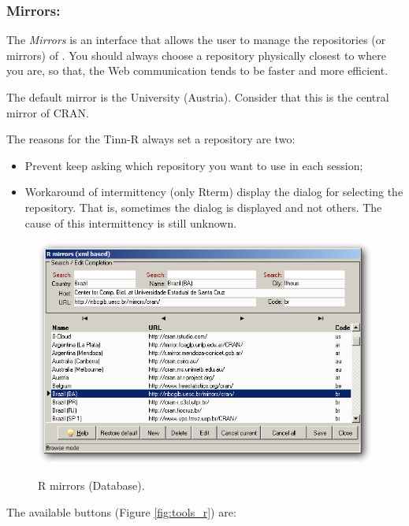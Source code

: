 \subsubsection{Mirrors:}

The \textit{Mirrors} is an interface that allows the user to manage the repositories (or mirrors) of \RR{}.
You should always choose a repository physically closest to where you are,
so that, the Web communication tends to be faster and more efficient.

The default mirror is the University 
(Austria). Consider that this is the central mirror of CRAN.

The reasons for the Tinn-R always set a repository are two:
\begin {itemize}
   \item Prevent \RR{} keep asking which repository you want to use in each session;
   \item Workaround of intermittency (only Rterm) display the dialog for selecting the repository.
    That is, sometimes the dialog is displayed and not others. The cause of this intermittency is still unknown.
\end {itemize}

\begin{figure}[h!]
  \includegraphics[scale=0.35]{./res/mirrors_dlg.png}\\
  \caption{R mirrors (Database).}
  \label{fig:mirrors_dlg_2}
\end{figure}

The available buttons
(Figure \ref{fig:tools_r})
are:

